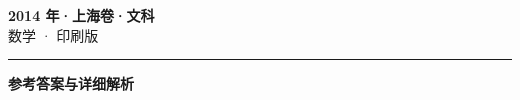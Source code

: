 \documentclass[zihao=5, a4paper]{ctexart}
\begin{document}
\begin{center}
  {\Large\bfseries 2014 年·上海卷·文科}\\[4pt]
  {\large 数学 · 印刷版}
\end{center}
\medskip
{}

\par\bigskip\hrule\bigskip
{}
\Needspace{0.55\textheight}
\begin{center}{\large\bfseries 参考答案与详细解析}\end{center}
\smallskip

\end{document}
